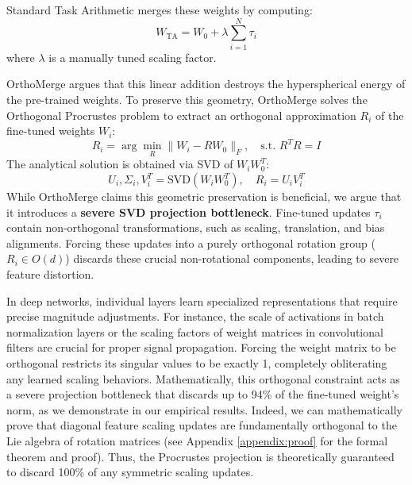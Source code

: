 \documentclass{article}
\begin{document}
Standard Task Arithmetic merges these weights by computing:
\begin{equation}
    W_{\text{TA}} = W_0 + \lambda \sum_{i=1}^N \tau_i
\end{equation}
where $\lambda$ is a manually tuned scaling factor.

OrthoMerge argues that this linear addition destroys the hyperspherical energy of the pre-trained weights. To preserve this geometry, OrthoMerge solves the Orthogonal Procrustes problem to extract an orthogonal approximation $R_i$ of the fine-tuned weights $W_i$:
\begin{equation}
    R_i = \arg\min_{R} \|W_i - R W_0\|_F, \quad \text{s.t. } R^T R = I
\end{equation}
The analytical solution is obtained via SVD of $W_i W_0^T$:
\begin{equation}
    U_i, \Sigma_i, V_i^T = \text{SVD}(W_i W_0^T), \quad R_i = U_i V_i^T
\end{equation}
While OrthoMerge claims this geometric preservation is beneficial, we argue that it introduces a \textbf{severe SVD projection bottleneck}. Fine-tuned updates $\tau_i$ contain non-orthogonal transformations, such as scaling, translation, and bias alignments. Forcing these updates into a purely orthogonal rotation group ($R_i \in O(d)$) discards these crucial non-rotational components, leading to severe feature distortion.

In deep networks, individual layers learn specialized representations that require precise magnitude adjustments. For instance, the scale of activations in batch normalization layers or the scaling factors of weight matrices in convolutional filters are crucial for proper signal propagation. Forcing the weight matrix to be orthogonal restricts its singular values to be exactly 1, completely obliterating any learned scaling behaviors. Mathematically, this orthogonal constraint acts as a severe projection bottleneck that discards up to 94\% of the fine-tuned weight's norm, as we demonstrate in our empirical results. Indeed, we can mathematically prove that diagonal feature scaling updates are fundamentally orthogonal to the Lie algebra of rotation matrices (see Appendix \ref{appendix:proof} for the formal theorem and proof). Thus, the Procrustes projection is theoretically guaranteed to discard 100\% of any symmetric scaling updates.
\end{document}
